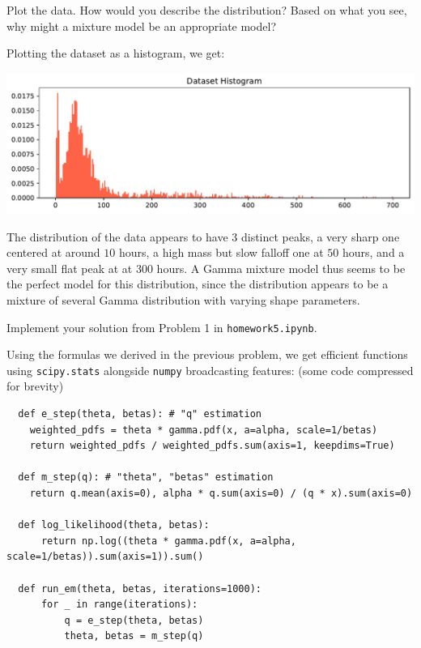 \documentclass[expanded]{lkx_pset}
\begin{document}
\begin{parts}
	\begin{part}{1} Plot the data.  How would you describe the distribution?
		Based on what you see, why might a mixture model be an appropriate
		model?
	\end{part}

	Plotting the dataset as a histogram, we get:
	\begin{center}
		\includegraphics[scale=0.7]{figures/p2_1_dataset.pdf}
	\end{center}
	The distribution of the data appears to have 3 distinct peaks, a very sharp one centered at around $10$ hours, a high mass but slow falloff one at $50$ hours, and a very small flat peak at at 300 hours. A Gamma mixture model thus seems to be the perfect model for this distribution, since the distribution appears to be a mixture of several Gamma distribution with varying shape parameters.

	\begin{part}{2} Implement your solution from Problem 1 in \texttt{homework5.ipynb}.
	\end{part}

	Using the formulas we derived in the previous problem, we get efficient functions using \texttt{scipy.stats} alongside \texttt{numpy} broadcasting features: (some code compressed for brevity)

	\begin{verbatim}
  def e_step(theta, betas): # "q" estimation
    weighted_pdfs = theta * gamma.pdf(x, a=alpha, scale=1/betas)
    return weighted_pdfs / weighted_pdfs.sum(axis=1, keepdims=True)

  def m_step(q): # "theta", "betas" estimation
    return q.mean(axis=0), alpha * q.sum(axis=0) / (q * x).sum(axis=0)

  def log_likelihood(theta, betas):
      return np.log((theta * gamma.pdf(x, a=alpha, scale=1/betas)).sum(axis=1)).sum()

  def run_em(theta, betas, iterations=1000):
      for _ in range(iterations):
          q = e_step(theta, betas)
          theta, betas = m_step(q)


\end{verbatim}
\end{parts}
\end{document}
